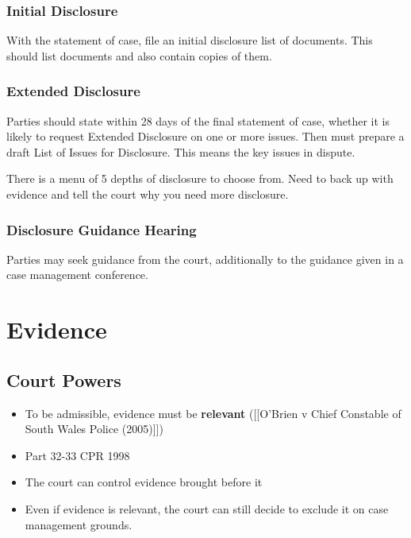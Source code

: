 \documentclass[
]{article}
\providecommand{\tightlist}{%
  \setlength{\itemsep}{0pt}\setlength{\parskip}{0pt}}
\begin{document}
\hypertarget{initial-disclosure}{%
\subsubsection{Initial Disclosure}\label{initial-disclosure}}

With the statement of case, file an initial disclosure list of
documents. This should list documents and also contain copies of them.

\hypertarget{extended-disclosure}{%
\subsubsection{Extended Disclosure}\label{extended-disclosure}}

Parties should state within 28 days of the final statement of case,
whether it is likely to request Extended Disclosure on one or more
issues. Then must prepare a draft List of Issues for Disclosure. This
means the key issues in dispute.

There is a menu of 5 depths of disclosure to choose from. Need to back
up with evidence and tell the court why you need more disclosure.

\hypertarget{disclosure-guidance-hearing}{%
\subsubsection{Disclosure Guidance
Hearing}\label{disclosure-guidance-hearing}}

Parties may seek guidance from the court, additionally to the guidance
given in a case management conference.

\hypertarget{evidence}{%
\section{Evidence}\label{evidence}}

\hypertarget{court-powers}{%
\subsection{Court Powers}\label{court-powers}}

\begin{itemize}
\tightlist
\item
  To be admissible, evidence must be \textbf{relevant} ({[}{[}O'Brien v
  Chief Constable of South Wales Police (2005){]}{]})
\item
  Part 32-33 CPR 1998
\item
  The court can control evidence brought before it
\item
  Even if evidence is relevant, the court can still decide to exclude it
  on case management grounds.
\end{itemize}
\end{document}
